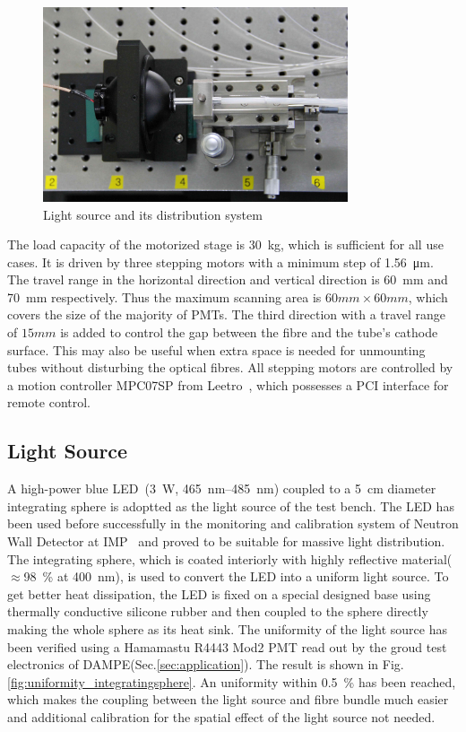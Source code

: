 \documentclass[5p, times]{elsarticle}
\begin{document}
\begin{figure}
 \centering
 \includegraphics[width=90mm]{light_source1_crop}
\caption{Light source and its distribution system}
\label{fig:light_source}
\end{figure} 

The load capacity of the motorized stage is \SI{30}{\kilo\gram}, which is sufficient for all use cases.
It is driven by three stepping motors with a minimum step of \SI{1.56}{\micro\meter}.
The travel range in the horizontal direction and vertical direction is \SI{60}{\milli\meter} and \SI{70}{\milli\meter} respectively.
Thus the maximum scanning area is $60mm\times60mm$, which covers the size of the majority of PMTs.
The third direction with a travel range of $15mm$ is added to control the gap between the fibre and the tube's cathode surface.
This may also be useful when extra space is needed for unmounting tubes without disturbing the optical fibres. 
All stepping motors are controlled by a motion controller MPC07SP from Leetro~\cite{leetro}, which possesses a PCI interface for remote control.

\subsection{Light Source}
\label{sec:light_source}

A high-power blue LED~\cite{zlight}(\SI{3}{\watt}, \SIrange{465}{485}{\nano\meter}) coupled to a \SI{5}{\centi\meter} diameter integrating sphere is adoptted as the light source of the test bench.
The LED has been used before successfully in the monitoring and calibration system of Neutron Wall Detector at IMP~\cite{yuyuhong_led} and proved to be suitable for massive light distribution.
The integrating sphere, which is coated interiorly with highly reflective material($\approx$\SI{98}{\percent} at \SI{400}{\nano\meter}), is used to convert the LED into a uniform light source.
To get better heat dissipation, the LED is fixed on a special designed base using thermally conductive silicone rubber and then coupled to the sphere directly making the whole sphere as its heat sink.
The uniformity of the light source has been verified using a Hamamastu R4443 Mod2 PMT read out by the groud test electronics of DAMPE(Sec.\ref{sec:application}). 
The result is shown in Fig.\ref{fig:uniformity_integratingsphere}. 
An uniformity within \textpm\SI{0.5}{\percent} has been reached, which makes the coupling between the light source and fibre bundle much easier and additional calibration for the spatial effect of the light source not needed. 
\end{document}
